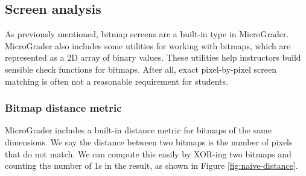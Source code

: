 \documentclass[12pt]{article}
\begin{document}
\subsection{Screen analysis}
As previously mentioned, bitmap screens are a built-in type in MicroGrader.  MicroGrader also includes some utilities for working with bitmaps, which are represented as a 2D array of binary values.  These utilities help instructors build sensible check functions for bitmaps.  After all, exact pixel-by-pixel screen matching is often not a reasonable requirement for students.

\subsubsection{Bitmap distance metric}
MicroGrader includes a built-in distance metric for bitmaps of the same dimensions.  We say the distance between two bitmaps is the number of pixels that do not match.  We can compute this easily by XOR-ing two bitmaps and counting the number of 1s in the result, as shown in Figure \ref{fig:naive-distance}.
\end{document}
